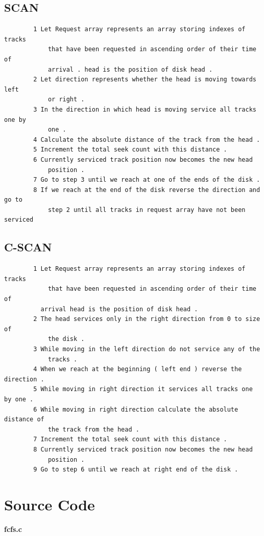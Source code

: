 \documentclass[13pt,oneside]{book}
\begin{document}
    \subsection*{SCAN}
    \begin{verbatim}
        1 Let Request array represents an array storing indexes of tracks
            that have been requested in ascending order of their time of
            arrival . head is the position of disk head .
        2 Let direction represents whether the head is moving towards left
            or right .
        3 In the direction in which head is moving service all tracks one by
            one .
        4 Calculate the absolute distance of the track from the head .
        5 Increment the total seek count with this distance .
        6 Currently serviced track position now becomes the new head
            position .
        7 Go to step 3 until we reach at one of the ends of the disk .
        8 If we reach at the end of the disk reverse the direction and go to
            step 2 until all tracks in request array have not been serviced
    \end{verbatim}
    \subsection*{C-SCAN}
    \begin{verbatim}
        1 Let Request array represents an array storing indexes of tracks
            that have been requested in ascending order of their time of
          arrival head is the position of disk head .
        2 The head services only in the right direction from 0 to size of
            the disk .
        3 While moving in the left direction do not service any of the
            tracks .
        4 When we reach at the beginning ( left end ) reverse the direction .
        5 While moving in right direction it services all tracks one by one .
        6 While moving in right direction calculate the absolute distance of
            the track from the head .
        7 Increment the total seek count with this distance .
        8 Currently serviced track position now becomes the new head
            position .
        9 Go to step 6 until we reach at right end of the disk .
    \end{verbatim}  
    
    \section*{Source Code}
    \Large\textbf{fcfs.c}
\small
\end{document}
